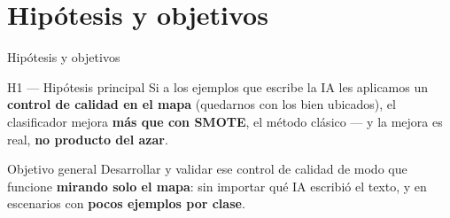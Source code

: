 
\section{Hipótesis y objetivos}

\begin{frame}[c]{Hipótesis y objetivos}
\begin{block}{H1 — Hipótesis principal}
\small
Si a los ejemplos que escribe la IA les aplicamos un \textbf{control de calidad en el mapa}
(quedarnos con los bien ubicados), el clasificador mejora \textbf{más que con SMOTE},
el método clásico — y la mejora es real, \textbf{no producto del azar}.
\end{block}

\begin{block}{Objetivo general}
\small
Desarrollar y validar ese control de calidad de modo que funcione \textbf{mirando solo el mapa}:
sin importar qué IA escribió el texto, y en escenarios con \textbf{pocos ejemplos por clase}.
\end{block}

\end{frame}
